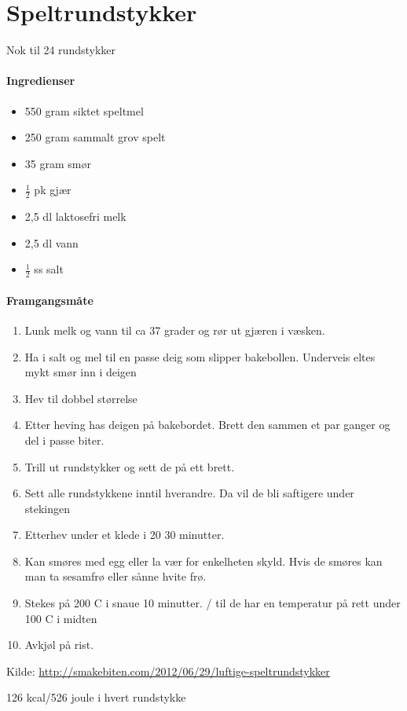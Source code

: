 \section{Speltrundstykker}
Nok til 24 rundstykker

\paragraph{Ingredienser}
\begin{itemize}[noitemsep]
	\item 550 gram siktet speltmel
	\item 250 gram sammalt grov spelt
	\item 35 gram smør
	\item  $\frac{1}{2}$  pk gjær
	\item 2,5 dl laktosefri melk
	\item 2,5 dl vann
	\item  $\frac{1}{2}$  ss salt
\end{itemize}


\paragraph{Framgangsmåte}
\begin{enumerate}[noitemsep]
	\item Lunk melk og vann til ca 37 grader og rør ut gjæren i væsken.
	\item Ha i salt og mel til en passe deig som slipper bakebollen. Underveis eltes mykt smør inn i deigen
	\item Hev til dobbel størrelse
	\item Etter heving has deigen på bakebordet. Brett den sammen et par ganger og del i passe biter.
	\item Trill ut rundstykker og sett de på ett brett.
	\item Sett alle rundstykkene inntil hverandre. Da vil de bli saftigere under stekingen
	\item Etterhev under et klede i 20 30 minutter.
	\item Kan smøres med egg eller la vær for enkelheten skyld. Hvis de smøres kan man ta sesamfrø eller sånne hvite frø.
	\item Stekes på 200 \degree C i snaue 10 minutter. / til de har en temperatur på rett under 100 \degree C i midten
	\item Avkjøl på rist.
\end{enumerate}

Kilde: \url{http://smakebiten.com/2012/06/29/luftige-speltrundstykker}


126 kcal/526 joule i hvert rundstykke
